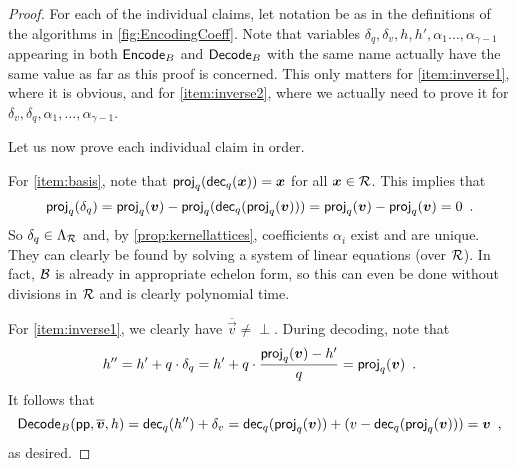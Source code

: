 \begin{proof}
For each of the individual claims, let notation be as in the definitions of the algorithms in \autoref{fig:EncodingCoeff}.
Note that variables $\delta_q,\delta_v, h, h', \alpha_1\ldots,\alpha_{\gamma-1}$ appearing in both $\mathsf{Encode}_B$ and $\mathsf{Decode}_B$ with the same name actually have the same value as far as this proof is concerned.
This only matters for \autoref{item:inverse1}, where it is obvious, and for \autoref{item:inverse2}, where we actually need to prove it for $\delta_v, \delta_q,\alpha_1,\ldots,\alpha_{\gamma-1}$.

\medskip\noindent
Let us now prove each individual claim in order.

\bigskip\noindent
For \autoref{item:basis}, note that $\mathsf{proj}_q(\mathsf{dec}_q(\boldsymbol{x})) = \boldsymbol{x}$ for all $\boldsymbol{x}\in\mathcal{R}$. This implies that
\[
 \mathsf{proj}_q(\delta_q) = \mathsf{proj}_q(\boldsymbol{v}) - \mathsf{proj}_q(\mathsf{dec}_q(\mathsf{proj}_q(\boldsymbol{v}))) = \mathsf{proj}_q(\boldsymbol{v}) - \mathsf{proj}_q(\boldsymbol{v}) = 0\enspace.
\]
So $\delta_q\in\Lambda_{\mathcal{R}}$ and, by \autoref{prop:kernellattices}, coefficients $\alpha_i$ exist and are unique. They can clearly be found by solving a system of linear equations (over $\mathcal{R}$). In fact, $\mathcal{B}$ is already in appropriate echelon form, so this can even be done without divisions in $\mathcal{R}$ and is clearly polynomial time.

\bigskip\noindent
For \autoref{item:inverse1}, we clearly have $\overline{\vec{v}} \neq \perp$. During decoding, note that
\[
 h'' = h' + q\cdot\delta_q = h'+q\cdot\frac{\mathsf{proj}_q(\boldsymbol{v})-h'}{q} = \mathsf{proj}_q(\boldsymbol{v})\enspace.
\]
It follows that
\[
 \mathsf{Decode}_B(\mathsf{pp},\overline{\boldsymbol{v}}, h) = \mathsf{dec}_q(h'') + \delta_v = \mathsf{dec}_q(\mathsf{proj}_q(\boldsymbol{v})) + (v - \mathsf{dec}_q(\mathsf{proj}_q(\boldsymbol{v}))) = \boldsymbol{v}\enspace,
\]
as desired.



\end{proof}
